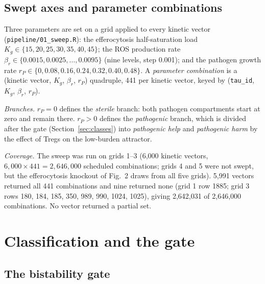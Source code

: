 \documentclass[11pt]{article}
\begin{document}
\subsection{Swept axes and parameter combinations}
\label{sec:axes}

Three parameters are set on a grid applied to every kinetic vector
(\texttt{pipeline/01\_sweep.R}): the efferocytosis half-saturation load
$K_g \in \{15, 20, 25, 30, 35, 40, 45\}$; the ROS production rate
$\beta_r \in \{0.0015, 0.0025, \dots, 0.0095\}$ (nine levels, step 0.001);
and the pathogen growth rate $r_P \in \{0, 0.08, 0.16, 0.24, 0.32, 0.40, 0.48\}$. A
\emph{parameter combination} is a (kinetic vector, $K_g$, $\beta_r$, $r_P$)
quadruple, 441 per kinetic vector, keyed by
(\texttt{tau\_id}, $K_g$, $\beta_r$, $r_P$).

\emph{Branches.} $r_P = 0$ defines the \emph{sterile} branch: both pathogen
compartments start at zero and remain there. $r_P > 0$ defines the
\emph{pathogenic} branch, which is divided after the gate (Section~\ref{sec:classes})
into \emph{pathogenic help} and \emph{pathogenic harm} by the effect of Tregs on the
low-burden attractor.

\emph{Coverage.} The sweep was run on grids 1--3 (6,000 kinetic vectors, $6{,}000 \times 441 = 2{,}646{,}000$ scheduled combinations; grids 4 and 5
were not swept, but the efferocytosis knockout of Fig.~2 draws from all five grids). 5,991 vectors returned all 441 combinations and nine returned none
(grid 1 row 1885; grid 3 rows 180, 184, 185, 350, 989, 990, 1024, 1025), giving
2,642,031 of 2,646,000 combinations. No vector returned a partial set.

\section{Classification and the gate}
\label{sec:classification}

\subsection{The bistability gate}
\label{sec:gate}
\end{document}
